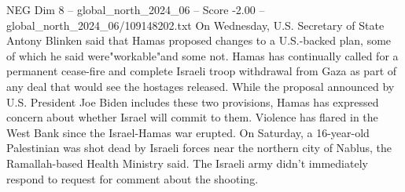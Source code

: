 \begin{textsample}{NEG Dim 8 – global\_north\_2024\_06 – Score -2.00 – global\_north\_2024\_06/109148202.txt}
On Wednesday, U.S.
Secretary of State Antony Blinken said that Hamas proposed changes to a U.S.-backed plan, some of which he said were"workable"and some not.
Hamas has continually called for a permanent cease-fire and complete Israeli troop withdrawal from Gaza as part of any deal that would see the hostages released.
While the proposal announced by U.S.
President Joe Biden includes these two provisions, Hamas has expressed concern about whether Israel will commit to them.
Violence has flared in the West Bank since the Israel-Hamas war erupted.
On Saturday, a 16-year-old Palestinian was shot dead by Israeli forces near the northern city of Nablus, the Ramallah-based Health Ministry said.
The Israeli army didn't immediately respond to request for comment about the shooting.

\end{textsample}
